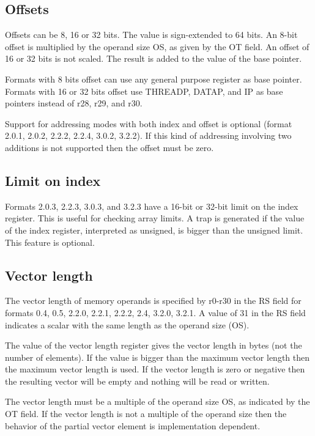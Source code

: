 \documentclass[forwardcom.tex]{subfiles}
\begin{document}
\subsection{Offsets}
Offsets can be 8, 16 or 32 bits. The value is sign-extended to 64 bits. An 8-bit offset is multiplied by the operand size OS, as given by the OT field. An offset of 16 or 32 bits is not scaled. The result is added to the value of the base pointer.
\vspace{2mm}

Formats with 8 bits offset can use any general purpose register as base pointer. Formats with 16 or
32 bits offset use THREADP, DATAP, and IP as base pointers instead of r28, r29, and r30.
\vspace{2mm}

Support for addressing modes with both index and offset is optional (format 2.0.1, 2.0.2, 2.2.2, 2.2.4, 3.0.2, 3.2.2). If this kind of addressing involving two additions is not supported then the offset must be zero.

\subsection{Limit on index}
Formats 2.0.3, 2.2.3, 3.0.3, and 3.2.3 have a 16-bit or 32-bit limit on the index register. This is useful for checking array limits. A trap is generated if the value of the index register, interpreted as unsigned, is bigger than the unsigned limit. This feature is optional.

\subsection{Vector length}
The vector length of memory operands is specified by r0-r30 in the RS field for formats 0.4, 0.5, 2.2.0, 2.2.1, 2.2.2, 2.4, 3.2.0, 3.2.1. A value of 31 in the RS field indicates a scalar with the same length as the operand size (OS).
\vspace{2mm}

The value of the vector length register gives the vector length in bytes (not the number of elements). If the value is bigger than the maximum vector length then the maximum vector length is used. 
If the vector length is zero or negative then the resulting vector will be empty and nothing will
be read or written.
\vspace{2mm}

The vector length must be a multiple of the operand size OS, as indicated by the OT field. If the vector length is not a multiple of the operand size then the behavior of the partial vector element is implementation dependent.
\vspace{2mm}
\end{document}
